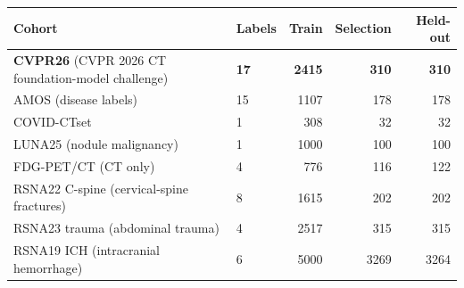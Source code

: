 \begin{tabular}{llrrr}
\toprule
Cohort & Labels & Train & Selection & Held-out \\
\midrule
\textbf{CVPR26} (CVPR 2026 CT foundation-model challenge) & \textbf{17} & \textbf{2415} & \textbf{310} & \textbf{310} \\
\quad AMOS (disease labels) & 15 & 1107 & 178 & 178 \\
\quad COVID-CTset & 1 & 308 & 32 & 32 \\
\quad LUNA25 (nodule malignancy) & 1 & 1000 & 100 & 100 \\
FDG-PET/CT (CT only) & 4 & 776 & 116 & 122 \\
RSNA22 C-spine (cervical-spine fractures) & 8 & 1615 & 202 & 202 \\
RSNA23 trauma (abdominal trauma) & 4 & 2517 & 315 & 315 \\
RSNA19 ICH (intracranial hemorrhage) & 6 & 5000 & 3269 & 3264 \\
\bottomrule
\end{tabular}
